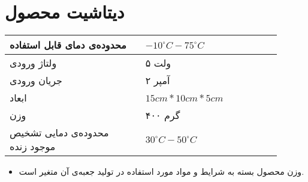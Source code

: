 \chapter{دیتاشیت محصول}



\begin{table}[ht!]
	\begin{tabular}{|p{0.45\linewidth}|p{0.45\linewidth}|}
		\hline		
				محدوده‌ی دمای قابل استفاده
		&    $-10 ^\circ C - 75 ^\circ C$
		\\ \hline
		ولتاژ ورودی
		&   
	۵ ولت	
		\\ \hline
		جریان ورودی
		&   
۲ آمپر
		\\ \hline
		ابعاد
		&   
$15cm * 10cm * 5cm$
		\\ \hline
		وزن
		&   
۴۰۰ گرم 
		\\ \hline
		   محدوده‌ی دمایی تشخیص موجود زنده &
		$30 ^\circ C - 50 ^\circ C$
		 \\ \hline
	\end{tabular}
\end{table}

\begin{itemize}
	\item 
وزن محصول بسته به شرایط و مواد مورد استفاده در تولید جعبه‌ی آن متغیر است.

\end{itemize}